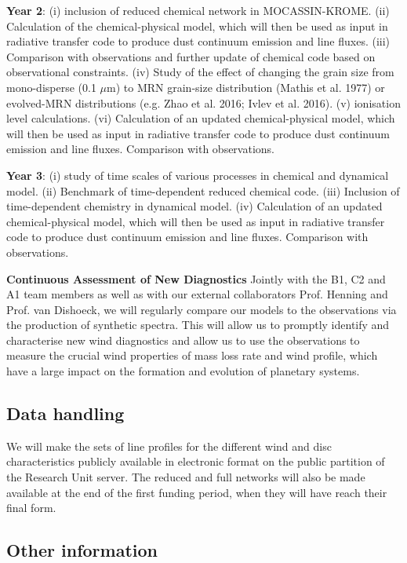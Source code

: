 \documentclass[10pt,fleqn,twoside]{article}
\newcommand{\Tcol}{\color{blue}}
\begin{document}
{\bf Year 2}: (i) inclusion of reduced chemical network in MOCASSIN-KROME. (ii) Calculation of the chemical-physical model, which will then be used as input in radiative transfer code to produce dust continuum emission and line fluxes. (iii) Comparison with observations and further update of chemical code based on observational constraints. (iv) Study of the effect of changing the grain size from mono-disperse (0.1 $\mu$m) to MRN grain-size distribution (Mathis et al. 1977) or evolved-MRN distributions (e.g. Zhao et al. 2016; Ivlev et al. 2016). (v) ionisation level calculations. (vi)  Calculation of an updated chemical-physical model, which will then be used as input in radiative transfer code to produce dust continuum emission and line fluxes. Comparison with observations.

{\bf Year 3}: (i) study of time scales of various processes in chemical and dynamical model. (ii) Benchmark of time-dependent reduced chemical code. (iii) Inclusion of time-dependent chemistry in dynamical model. (iv)  Calculation of an updated chemical-physical model, which will then be used as input in radiative transfer code to produce dust continuum emission and line fluxes. Comparison with observations.

{\bf Continuous Assessment of New Diagnostics} Jointly with the B1, C2 and A1 team members as well as with our external collaborators Prof. Henning and Prof. van Dishoeck, we will regularly compare our models to the observations via the production of synthetic spectra. This will allow us to promptly identify and characterise new wind diagnostics and allow us to use the observations to measure the crucial wind properties of mass loss rate and wind profile, which have a large impact on the formation and evolution of planetary systems. 

\subsection{\Tcol Data handling}
We will make the sets of line profiles for the different wind and disc characteristics publicly available in electronic format on the public partition of the Research Unit server. The reduced and full networks will also be made available at the end of the first funding period, when they will have reach their final form. 

\subsection{\Tcol Other information}
\end{document}
